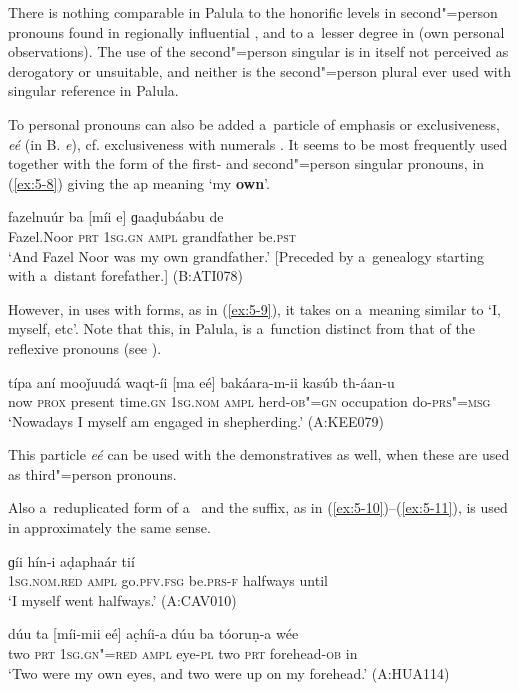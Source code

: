 There is nothing comparable in Palula to the honorific levels in second"=person pronouns found in regionally influential  \citep[17]{schmidt1999}, and to a~lesser degree in  (own personal observations). The use of the second"=person singular is in itself not perceived as derogatory or unsuitable, and neither is the second"=person plural  ever used with singular reference in Palula.

To personal pronouns can also be added a~particle of emphasis or exclusiveness, \textit{eé} (in B. \textit{e}), cf. exclusiveness with numerals . It seems to be most frequently used together with the  form of the first- and second"=person singular pronouns, in (\ref{ex:5-8}) giving the ap meaning `my \textbf{own}'.



\begin{exe}
\ex
\label{ex:5-8}
\gll fazelnuúr ba [míi e] ɡaaḍubáabu de \\
	Fazel.Noor \textsc{prt} \textsc{1sg.gn} \textsc{ampl} grandfather be.\textsc{pst} \\
\glt `And Fazel Noor was my own grandfather.' [Preceded by a~genealogy starting with a~distant forefather.] (B:ATI078)
\end{exe}

However, in uses with   forms, as in (\ref{ex:5-9}), it takes on a~meaning similar to `I, myself, etc'. Note that this, in Palula, is a~function distinct from that of the reflexive pronouns (see ).

\begin{exe}
\ex
\label{ex:5-9}
\gll típa aní mooǰuudá waqt-íi [ma eé] bakáara-m-ii kasúb th-áan-u\\
	now \textsc{prox} present time.\textsc{gn} \textsc{1sg.nom} \textsc{ampl} herd-\textsc{ob"=gn} occupation do-\textsc{prs"=msg}\\
\glt `Nowadays I myself am engaged in shepherding.' (A:KEE079)
\end{exe}

This particle \textit{eé} can be used with the demonstratives as well, when these are used as third"=person pronouns. 

Also a~reduplicated form of a~ and the suffix, as in (\ref{ex:5-10})--(\ref{ex:5-11}), is used in approximately the same sense.


\begin{exe}
\ex
\label{ex:5-10}
\gll [mam eé] ɡíi hín-i aḍaphaár tií\\
\textsc{1sg.nom.red} \textsc{ampl} go.\textsc{pfv.fsg} be.\textsc{prs-f} halfways until \\
\glt `I myself went halfways.' (A:CAV010)

\ex
\label{ex:5-11}
\gll dúu ta [míi-mii eé] ac̣híi-a dúu ba tóoruṇ-a wée \\
	two \textsc{prt} \textsc{1sg.gn"=red} \textsc{ampl} eye-\textsc{pl} two \textsc{prt} forehead-\textsc{ob} in \\
\glt `Two were my own eyes, and two were up on my forehead.' (A:HUA114) 
\end{exe}

